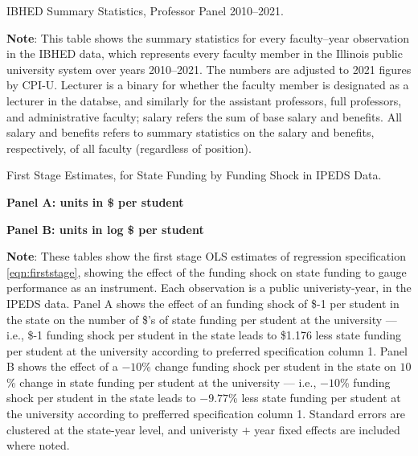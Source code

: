 \begin{table}[H]
    \singlespacing
    \centering
    \caption{IBHED Summary Statistics, Professor Panel 2010--2021.}
    \makebox[\textwidth][c]{}
    \label{tab:illinois-summary}

    \justify
    \footnotesize
    \textbf{Note}:
    This table shows the summary statistics for every faculty--year observation in the IBHED data, which represents every faculty member in the Illinois public university system over years 2010--2021.
    The numbers are adjusted to 2021 figures by CPI-U.
    Lecturer is a binary for whether the faculty member is designated as a lecturer in the databse, and similarly for the assistant professors, full professors, and administrative faculty;
    salary refers the sum of base salary and benefits.
    All salary and benefits refers to summary statistics on the salary and benefits, respectively, of all faculty (regardless of position).
\end{table}

\newpage
\begin{table}[h!]
    \singlespacing
    \centering
    \caption{First Stage Estimates, for State Funding by Funding Shock in IPEDS Data.}
    \textbf{Panel A: units in \$ per student}
    
    \makebox[\textwidth][c]{}
    
    \textbf{Panel B: units in log \$ per student}
    
    \makebox[\textwidth][c]{}
    
    \label{tab:firststage-reg}
    \justify
    \footnotesize
    \textbf{Note}:
    These tables show the first stage OLS estimates of regression specification \eqref{eqn:firststage}, showing the effect of the funding shock on state funding to gauge performance as an instrument.
    Each observation is a public univeristy-year, in the IPEDS data.
    Panel A shows the effect of an funding shock of \$-1 per student in the state on the number of \$'s of state funding per student at the university --- i.e.,
    \$-1 funding shock per student in the state leads to \$1.176 less state funding per student at the university according to preferred specification column 1.
    Panel B shows the effect of a $-10$\% change funding shock per student in the state on $10$\% change in state funding per student at the university --- i.e.,
    $-10$\% funding shock per student in the state leads to $-9.77$\% less state funding per student at the university according to prefferred specification column 1.        
    Standard errors are clustered at the state-year level, and univeristy $+$ year fixed effects are included where noted.
\end{table}

